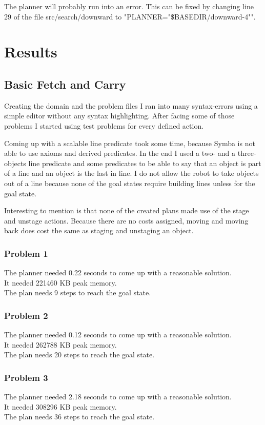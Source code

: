 \documentclass[paper=a4, fontsize=11pt]{scrartcl} %
\numberwithin{equation}{section} %
\numberwithin{figure}{section} %
\numberwithin{table}{section} %
\begin{document}
The planner will probably run into an error. This can be fixed by changing line 29 of the file src/search/downward to "PLANNER="\$BASEDIR/downward-4"".

\section{Results}
\subsection{Basic Fetch and Carry}
Creating the domain and the problem files I ran into many syntax-errors using a simple editor without any syntax highlighting. 
After facing some of those problems I started using test problems for every defined action.\vspace{5mm}

Coming up with a scalable line predicate took some time, because Symba is not able to use axioms and derived predicates. In the end I used a two- and a three-objects line predicate and some predicates to be able to say that an object is part of a line and an object is the last in line.
I do not allow the robot to take objects out of a line because none of the goal states require building lines unless for the goal state.\vspace{5mm}

Interesting to mention is that none of the created plans made use of the stage and unstage actions. Because there are no costs assigned, moving and moving back does cost the same as staging and unstaging an object.

\subsubsection{Problem 1}
The planner needed 0.22 seconds to come up with a reasonable solution.\\
It needed 221460 KB peak memory.\\
The plan needs 9 steps to reach the goal state.

\subsubsection{Problem 2}
The planner needed 0.12 seconds to come up with a reasonable solution. \\
It needed 262788 KB peak memory.\\
The plan needs 20 steps to reach the goal state.

\subsubsection{Problem 3}
The planner needed 2.18 seconds to come up with a reasonable solution. \\
It needed 308296 KB peak memory.\\
The plan needs 36 steps to reach the goal state.
\end{document}
